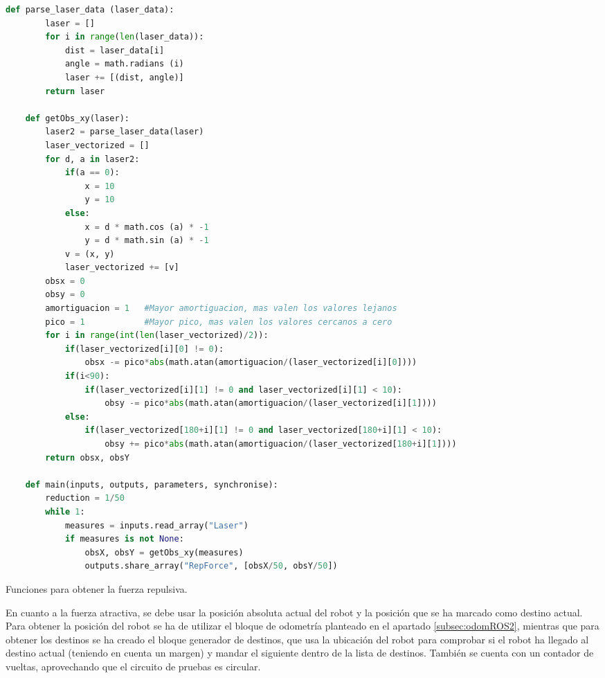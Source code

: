 \begin{code}[H]
    \begin{lstlisting}[language=python]
    def parse_laser_data (laser_data):
        laser = []
        for i in range(len(laser_data)):
            dist = laser_data[i]
            angle = math.radians (i)
            laser += [(dist, angle)]
        return laser
    
    def getObs_xy(laser):
        laser2 = parse_laser_data(laser)
        laser_vectorized = []
        for d, a in laser2:
            if(a == 0):
                x = 10
                y = 10
            else:
                x = d * math.cos (a) * -1
                y = d * math.sin (a) * -1
            v = (x, y)
            laser_vectorized += [v]
        obsx = 0
        obsy = 0    
        amortiguacion = 1   #Mayor amortiguacion, mas valen los valores lejanos
        pico = 1            #Mayor pico, mas valen los valores cercanos a cero
        for i in range(int(len(laser_vectorized)/2)):
            if(laser_vectorized[i][0] != 0):
                obsx -= pico*abs(math.atan(amortiguacion/(laser_vectorized[i][0])))
            if(i<90):
                if(laser_vectorized[i][1] != 0 and laser_vectorized[i][1] < 10):
                    obsy -= pico*abs(math.atan(amortiguacion/(laser_vectorized[i][1])))
            else:
                if(laser_vectorized[180+i][1] != 0 and laser_vectorized[180+i][1] < 10):
                    obsy += pico*abs(math.atan(amortiguacion/(laser_vectorized[180+i][1])))
        return obsx, obsY

    def main(inputs, outputs, parameters, synchronise):
        reduction = 1/50
        while 1:    
            measures = inputs.read_array("Laser")
            if measures is not None:
                obsX, obsY = getObs_xy(measures)
                outputs.share_array("RepForce", [obsX/50, obsY/50])
    \end{lstlisting}
    \caption[Funciones para obtener la fuerza repulsiva]{Funciones para obtener la fuerza repulsiva.}
    \label{cod:parse_laser_data}
\end{code}

En cuanto a la fuerza atractiva, se debe usar la posición absoluta actual del robot y la posición que se ha marcado como destino actual. Para obtener la
posición del robot se ha de utilizar el bloque de odometría planteado en el apartado \ref{subsec:odomROS2}, mientras que para obtener
los destinos se ha creado el bloque generador de destinos, que usa la ubicación del robot para comprobar si el robot ha llegado al destino
actual (teniendo en cuenta un margen) y mandar el siguiente dentro de la lista de destinos. También se cuenta con un contador
de vueltas, aprovechando que el circuito de pruebas es circular.

